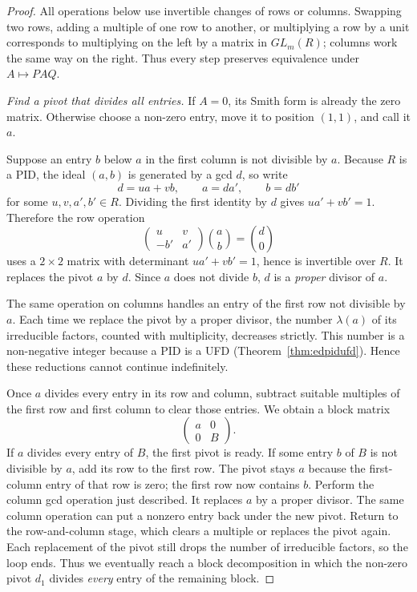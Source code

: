 \begin{proof}
All operations below use invertible changes of rows or columns. Swapping two rows, adding a multiple of one row to another, or multiplying a row by a unit corresponds to multiplying on the left by a matrix in $GL_m(R)$; columns work the same way on the right. Thus every step preserves equivalence under $A\mapsto PAQ$.

\emph{Find a pivot that divides all entries.}
If $A=0$, its Smith form is already the zero matrix. Otherwise choose a non-zero entry, move it to position $(1,1)$, and call it $a$.

Suppose an entry $b$ below $a$ in the first column is not divisible by $a$. Because $R$ is a PID, the ideal $(a,b)$ is generated by a gcd $d$, so write
\[
d=ua+vb,\qquad a=da',\qquad b=db'
\]
for some $u,v,a',b'\in R$. Dividing the first identity by $d$ gives $ua'+vb'=1$. Therefore the row operation
\[
\begin{pmatrix}u&v\\-b'&a'\end{pmatrix}
\binom ab=\binom d0
\]
uses a $2\times2$ matrix with determinant $ua'+vb'=1$, hence is invertible over $R$. It replaces the pivot $a$ by $d$. Since $a$ does not divide $b$, $d$ is a \emph{proper} divisor of $a$.

The same operation on columns handles an entry of the first row not divisible by $a$. Each time we replace the pivot by a proper divisor, the number $\lambda(a)$ of its irreducible factors, counted with multiplicity, decreases strictly. This number is a non-negative integer because a PID is a UFD (Theorem~\ref{thm:edpidufd}). Hence these reductions cannot continue indefinitely.

Once $a$ divides every entry in its row and column, subtract suitable multiples of the first row and first column to clear those entries. We obtain a block matrix
\[
\begin{pmatrix}a&0\\0&B\end{pmatrix}.
\]
If $a$ divides every entry of $B$, the first pivot is ready. If some entry $b$ of $B$ is not divisible by $a$, add its row to the first row. The pivot stays $a$ because the first-column entry of that row is zero; the first row now contains $b$. Perform the column gcd operation just described. It replaces $a$ by a proper divisor. The same column operation can put a nonzero entry back under the new pivot. Return to the row-and-column stage, which clears a multiple or replaces the pivot again. Each replacement of the pivot still drops the number of irreducible factors, so the loop ends. Thus we eventually reach a block decomposition in which the non-zero pivot $d_1$ divides \emph{every} entry of the remaining block.


\end{proof}
